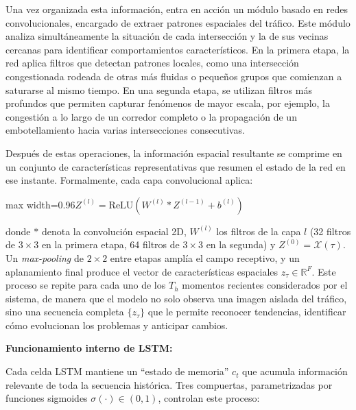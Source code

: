 \documentclass[12pt,a4paper,oneside]{report}
\newenvironment{centeredmath}
  {\begin{center}\begin{adjustbox}{max width=0.96\linewidth}\(\displaystyle}
  {\)\end{adjustbox}\end{center}}
\begin{document}
Una vez organizada esta información, entra en acción un módulo basado en redes convolucionales, encargado de extraer patrones espaciales del tráfico. Este módulo analiza simultáneamente la situación de cada intersección y la de sus vecinas cercanas para identificar comportamientos característicos. En la primera etapa, la red aplica filtros que detectan patrones locales, como una intersección congestionada rodeada de otras más fluidas o pequeños grupos que comienzan a saturarse al mismo tiempo. En una segunda etapa, se utilizan filtros más profundos que permiten capturar fenómenos de mayor escala, por ejemplo, la congestión a lo largo de un corredor completo o la propagación de un embotellamiento hacia varias intersecciones consecutivas.

Después de estas operaciones, la información espacial resultante se comprime en un conjunto de características representativas que resumen el estado de la red en ese instante. Formalmente, cada capa convolucional aplica:

\begin{centeredmath}
Z^{(l)} = \mathrm{ReLU}\!\left(W^{(l)} * Z^{(l - 1)} + b^{(l)}\right)
\end{centeredmath}

donde \(*\) denota la convolución espacial 2D, \(W^{(l)}\) los filtros de la capa \(l\) (32 filtros de \(3 \times 3\) en la primera etapa, 64 filtros de \(3 \times 3\) en la segunda) y \(Z^{(0)} = \mathcal{X}(\tau)\). Un \emph{max-pooling} de \(2 \times 2\) entre etapas amplía el campo receptivo, y un aplanamiento final produce el vector de características espaciales \(z_{\tau} \in \mathbb{R}^{F}\). Este proceso se repite para cada uno de los \(T_{h}\) momentos recientes considerados por el sistema, de manera que el modelo no solo observa una imagen aislada del tráfico, sino una secuencia completa \(\{z_{\tau}\}\) que le permite reconocer tendencias, identificar cómo evolucionan los problemas y anticipar cambios.

\textbf{Funcionamiento interno de LSTM:}

Cada celda LSTM mantiene un ``estado de memoria'' \(c_{t}\) que acumula información relevante de toda la secuencia histórica. Tres compuertas, parametrizadas por funciones sigmoides \(\sigma(\cdot) \in (0,1)\), controlan este proceso:
\end{document}
